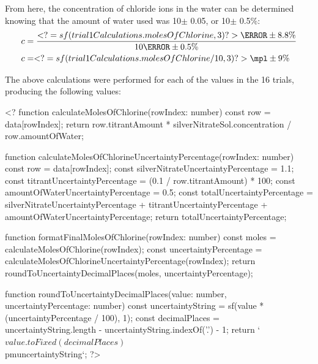 \documentclass[11pt]{article}
\begin{document}
From here, the concentration of chloride ions in the water can be determined knowing that the amount of water used was 10\ml $\pm$ 0.05\ml, or 10\ml $\pm$ 0.5\%:
%
\begin{align*}
	c & = \frac{<?= sf(trial1Calculations.molesOfChlorine, 3) ?>\mmol \pm 8.8\%}{10\mL \pm 0.5\%}
	\\
	c & = <?= sf(trial1Calculations.molesOfChlorine / 10, 3) ?>\mpl \pm 9\%
\end{align*}

The above calculations were performed for each of the values in the 16 trials, producing the following values:

<?
function calculateMolesOfChlorine(rowIndex: number) {
	const row = data[rowIndex];
	return row.titrantAmount * silverNitrateSol.concentration / row.amountOfWater;
}

function calculateMolesOfChlorineUncertaintyPercentage(rowIndex: number) {
	const row = data[rowIndex];
	const silverNitrateUncertaintyPercentage = 1.1;
	const titrantUncertaintyPercentage = (0.1 / row.titrantAmount) * 100;
	const amountOfWaterUncertaintyPercentage = 0.5;
	const totalUncertaintyPercentage =
		silverNitrateUncertaintyPercentage +
		titrantUncertaintyPercentage +
		amountOfWaterUncertaintyPercentage;
	return totalUncertaintyPercentage;
}

function formatFinalMolesOfChlorine(rowIndex: number) {
	const moles = calculateMolesOfChlorine(rowIndex);
	const uncertaintyPercentage = calculateMolesOfChlorineUncertaintyPercentage(rowIndex);
	return roundToUncertaintyDecimalPlaces(moles, uncertaintyPercentage);
}

function roundToUncertaintyDecimalPlaces(value: number, uncertaintyPercentage: number) {
	const uncertaintyString = sf(value * (uncertaintyPercentage / 100), 1);
	const decimalPlaces = uncertaintyString.length - uncertaintyString.indexOf('.') - 1;
	return `${value.toFixed(decimalPlaces)} $\\pm$ ${uncertaintyString}`;
}
?>
\end{document}
